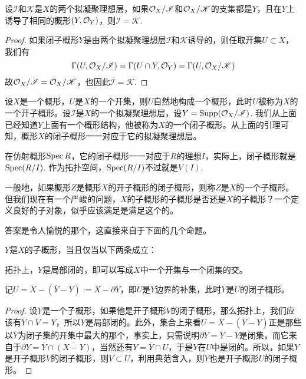 \begin{lem}
设$\mathscr{I}$和$\mathscr{K}$是$X$的两个拟凝聚理想层，如果$\mathcal{O}_X/\mathscr{I}$和$\mathcal{O}_X/\mathscr{K}$的支集都是$Y$，且在$Y$上诱导了相同的概形$(Y,\mathcal{O}_Y)$，则$\mathscr{I}=\mathscr{K}$.
\end{lem}

\begin{proof}
如果闭子概形$Y$是由两个拟凝聚理想层$\mathscr{I}$和$\mathscr{K}$诱导的，则任取开集$U\subset X$，我们有
\[
	\Gamma(U,\mathcal{O}_X/\mathscr{I})=\Gamma(U\cap Y,\mathcal{O}_Y)=\Gamma(U,\mathcal{O}_X/\mathscr{K})
\]
故$\mathcal{O}_X/\mathscr{I}=\mathcal{O}_X/\mathscr{K}$，也因此$\mathscr{I}=\mathscr{K}$.
\end{proof}

\begin{para}[子概形]
设$X$是一个概形，$U$是$X$的一个开集，则$U$自然地构成一个概形，此时$U$被称为$X$的一个开子概形。设$\mathscr{I}$是$X$的一个拟凝聚理想层，设$Y=\mathrm{Supp}(\mathcal{O}_X/\mathscr{I})$. 我们从上面已经知道$Y$上面有一个概形结构，他被称为$X$的一个闭子概形。从上面的引理可知，概形$X$的闭子概形一一对应于它的拟凝聚理想层。

在仿射概形$\operatorname{Spec} R$，它的闭子概形一一对应于$R$的理想$I$，实际上，闭子概形就是$\operatorname{Spec}(R/I)$. 作为拓扑空间，$\operatorname{Spec}(R/I)$不过就是$V(I)$.

一般地，如果概形$Z$是概形$X$的开子概形的闭子概形，则称$Z$是$X$的一个子概形。但我们现在有一个严峻的问题，$X$的子概形的子概形是否还是$X$的子概形？一个定义良好的子对象，似乎应该满足是满足这个的。
\end{para}

答案是令人愉悦的那个，这直接来自于下面的几个命题。

\begin{pro}[子概形的刻画]
$Y$是$X$的子概形，当且仅当以下两条成立：
\begin{compactenum}[~~~1.]
\item 拓扑上，$Y$是局部闭的，即可以写成$X$中一个开集与一个闭集的交。
\item 记$U=X-(\overline{Y}-Y):=X-\partial Y$，即$U$是$Y$边界的补集，此时$Y$是$U$的闭子概形。
\end{compactenum}
\end{pro}

\begin{proof}
	设$Y$是一个子概形，如果他是开子概形$V$的闭子概形，那么拓扑上，我们应该有$\overline{Y}\cap V=Y$，所以$Y$是局部闭的。此外，集合上来看$U=X-(\overline{Y}-Y)$正是那些以$Y$为闭子集的开集中最大的那个，事实上，只需说明$\partial Y=\overline{Y}-Y$是闭集，而它来自于$\partial Y=\overline{Y}\cap \overline{(X-Y)}$，当然还有$Y=\overline{Y}\cap U$，于是$Y$在$U$中是闭的。所以，如果$Y$是开子概形$V$的闭子概形，则$V\subset U$，利用典范含入，则$Y$也是开子概形$U$的闭子概形。
\end{proof}


